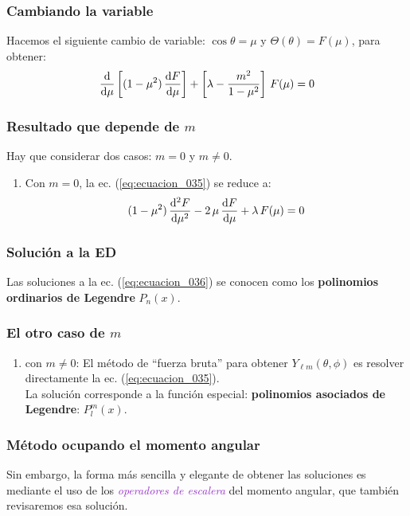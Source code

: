 \documentclass[12pt]{beamer}
\begin{document}
\begin{frame}
\frametitle{Cambiando la variable}
Hacemos el siguiente cambio de variable: $\cos \theta = \mu$ y $\Theta(\theta) = F(\mu)$, para obtener:
\pause
\begin{align}
\dv{\mu} \left[ (1 - \mu^{2}) \, \dv{F}{\mu} \right] + \left[ \lambda - \dfrac{m^{2}}{1 - \mu^{2}} \right] \, F(\mu) = 0
\label{eq:ecuacion_035}
\end{align}
\end{frame}
\begin{frame}
\frametitle{Resultado que depende de $m$}
Hay que considerar dos casos: $m = 0$ y $m \neq 0$.
\pause
{}
\begin{enumerate}[<+->]
\item Con $m = 0$, la ec. (\ref{eq:ecuacion_035}) se reduce a:
\pause
\begin{align}
(1 - \mu^{2}) \, \dv[2]{F}{\mu} - 2  \, \mu \, \dv{F}{\mu} + \lambda \, F(\mu) = 0
\label{eq:ecuacion_036}
\end{align}
\seti
\end{enumerate}
\end{frame}
\begin{frame}
\frametitle{Solución a la ED}
Las soluciones a la ec. (\ref{eq:ecuacion_036}) se conocen como los \textbf{\textcolor{blue(munsell)}{polinomios ordinarios de Legendre}} $P_{n} (x)$.
\end{frame}
\begin{frame}
\frametitle{El otro caso de $m$}
\begin{enumerate}[<+->]
\conti
\item con $m \neq 0$: \pause El método de \enquote{fuerza bruta} para obtener $Y_{\ell m} (\theta, \phi)$ es resolver directamente la ec. (\ref{eq:ecuacion_035}).
\\
\bigskip
\pause
La solución corresponde a la función especial: \textbf{\textcolor{carmine}{polinomios asociados de Legendre}}: $P_{l}^{m} (x)$.
\end{enumerate}
\end{frame}
\begin{frame}
\frametitle{Método ocupando el momento angular}
Sin embargo, \pause la forma más sencilla y elegante de obtener las soluciones es mediante el uso de los \emph{\textcolor{darkorchid}{operadores de escalera}} del momento angular, que también revisaremos esa solución.
\end{frame}
\end{document}
